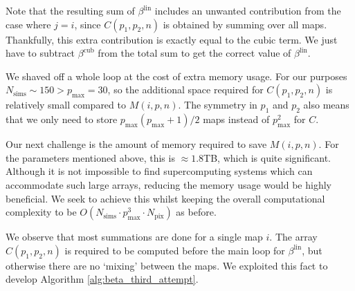 Note that the resulting sum of $\beta^\text{lin}$ includes an unwanted contribution from the case where $j=i$, since $C(p_1,p_2,n)$ is obtained by summing over all maps. Thankfully, this extra contribution is exactly equal to the cubic term. We just have to subtract $\beta^\text{cub}$ from the total sum to get the correct value of $\beta^\text{lin}$.

We shaved off a whole loop at the cost of extra memory usage. For our purposes $N_\text{sims} \sim 150 > p_\text{max} = 30$, so the additional space required for $C(p_1,p_2,n)$ is relatively small compared to $M(i,p,n)$. The symmetry in $p_1$ and $p_2$ also means that we only need to store $p_\text{max}(p_\text{max}+1)/2$ maps instead of $p_\text{max}^2$ for $C$.

Our next challenge is the amount of memory required to save $M(i,p,n)$. For the parameters mentioned above, this is $\approx 1.8$TB, which is quite significant. Although it is not impossible to find supercomputing systems which can accommodate such large arrays, reducing the memory usage would be highly beneficial. We seek to achieve this whilst keeping the overall computational complexity to be $O(N_\text{sims} \cdot p_\text{max}^3 \cdot N_\text{pix})$ as before.

We observe that most summations are done for a single map $i$. The array $C(p_1,p_2,n)$ is required to be computed before the main loop for $\beta^\text{lin}$, but otherwise there are no `mixing' between the maps. We exploited this fact to develop Algorithm \ref{alg:beta_third_attempt}.

